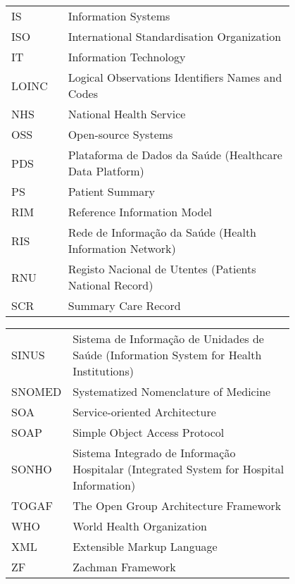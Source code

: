 \begin{flushleft}
\begin{tabular}{l p{0.8\linewidth}}
IS		& Information Systems \\
ISO		& International Standardisation Organization \\
IT		& Information Technology \\
LOINC   & Logical Observations Identifiers Names and Codes \\
NHS		& National Health Service \\
OSS		& Open-source Systems \\
PDS		& Plataforma de Dados da Saúde (Healthcare Data Platform) \\
PS		& Patient Summary \\
RIM		& Reference Information Model \\
RIS		& Rede de Informação da Saúde (Health Information Network) \\
RNU		& Registo Nacional de Utentes (Patients National Record) \\
SCR		& Summary Care Record
\end{tabular}
\end{flushleft}

\begin{flushleft}
\begin{tabular}{l p{0.8\linewidth}}
SINUS	& Sistema de Informação de Unidades de Saúde (Information System for Health Institutions)\\
SNOMED	& Systematized Nomenclature of Medicine \\
SOA		& Service-oriented Architecture \\
SOAP	& Simple Object Access Protocol \\
SONHO	& Sistema Integrado de Informação Hospitalar (Integrated System for Hospital Information) \\
TOGAF   & The Open Group Architecture Framework \\
WHO		& World Health Organization \\
XML	    & Extensible Markup Language \\
ZF		& Zachman Framework 
\end{tabular}
\end{flushleft}